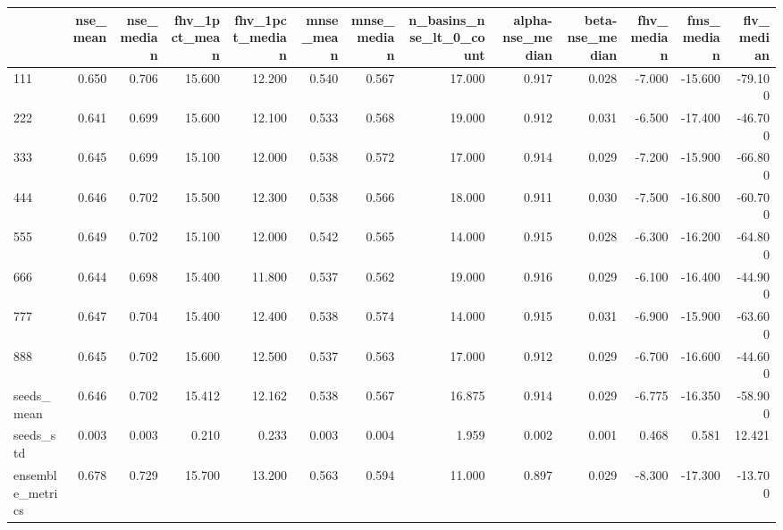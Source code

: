 \begin{tabular}{lrrrrrrrrrrrr}
\toprule
 & nse_mean & nse_median & fhv_1pct_mean & fhv_1pct_median & mnse_mean & mnse_median & n_basins_nse_lt_0_count & alpha-nse_median & beta-nse_median & fhv_median & fms_median & flv_median \\
\midrule
111 & 0.650 & 0.706 & 15.600 & 12.200 & 0.540 & 0.567 & 17.000 & 0.917 & 0.028 & -7.000 & -15.600 & -79.100 \\
222 & 0.641 & 0.699 & 15.600 & 12.100 & 0.533 & 0.568 & 19.000 & 0.912 & 0.031 & -6.500 & -17.400 & -46.700 \\
333 & 0.645 & 0.699 & 15.100 & 12.000 & 0.538 & 0.572 & 17.000 & 0.914 & 0.029 & -7.200 & -15.900 & -66.800 \\
444 & 0.646 & 0.702 & 15.500 & 12.300 & 0.538 & 0.566 & 18.000 & 0.911 & 0.030 & -7.500 & -16.800 & -60.700 \\
555 & 0.649 & 0.702 & 15.100 & 12.000 & 0.542 & 0.565 & 14.000 & 0.915 & 0.028 & -6.300 & -16.200 & -64.800 \\
666 & 0.644 & 0.698 & 15.400 & 11.800 & 0.537 & 0.562 & 19.000 & 0.916 & 0.029 & -6.100 & -16.400 & -44.900 \\
777 & 0.647 & 0.704 & 15.400 & 12.400 & 0.538 & 0.574 & 14.000 & 0.915 & 0.031 & -6.900 & -15.900 & -63.600 \\
888 & 0.645 & 0.702 & 15.600 & 12.500 & 0.537 & 0.563 & 17.000 & 0.912 & 0.029 & -6.700 & -16.600 & -44.600 \\
seeds_mean & 0.646 & 0.702 & 15.412 & 12.162 & 0.538 & 0.567 & 16.875 & 0.914 & 0.029 & -6.775 & -16.350 & -58.900 \\
seeds_std & 0.003 & 0.003 & 0.210 & 0.233 & 0.003 & 0.004 & 1.959 & 0.002 & 0.001 & 0.468 & 0.581 & 12.421 \\
ensemble_metrics & 0.678 & 0.729 & 15.700 & 13.200 & 0.563 & 0.594 & 11.000 & 0.897 & 0.029 & -8.300 & -17.300 & -13.700 \\
\bottomrule
\end{tabular}

